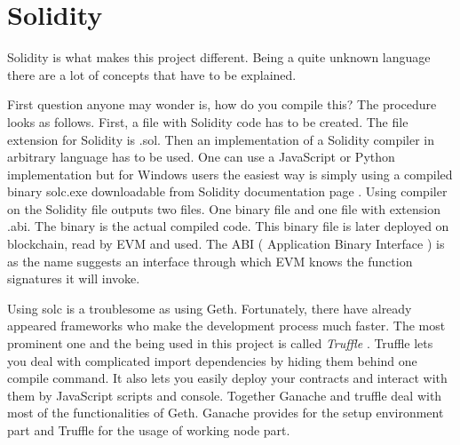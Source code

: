 \documentclass[a4paper,12pt,twoside,openany]{report}
\begin{document}
\section{Solidity} \label{solidity}

Solidity is what makes this project different. Being a quite unknown language there are a lot of concepts that have to be explained.

First question anyone may wonder is, how do you compile this? The procedure looks as follows. First, a file with Solidity code has to be created. The file extension for Solidity is .sol. Then an implementation  of a Solidity compiler in arbitrary language has to be used. One can use a JavaScript or Python implementation but for Windows users the easiest way is simply using a compiled binary solc.exe downloadable from Solidity documentation page \cite{solc}. Using compiler on the Solidity file outputs two files. One binary file and one file with extension .abi. The binary is the actual compiled code. This binary file is later deployed on blockchain, read by EVM and used. The ABI ( Application Binary Interface ) is as the name suggests an interface through which EVM knows the function signatures it will invoke. 

Using solc is a troublesome as using Geth. Fortunately, there have already appeared frameworks who make the development process much faster. The most prominent one and the being used in this project is called \textit{Truffle} \cite{truffle}. Truffle lets you deal with complicated import dependencies by hiding them behind one compile command. It also lets you easily deploy your contracts and interact with them by JavaScript scripts and console. Together Ganache and truffle deal with most of the functionalities of Geth. Ganache provides for the setup environment part and Truffle for the usage of working node part.
\end{document}

